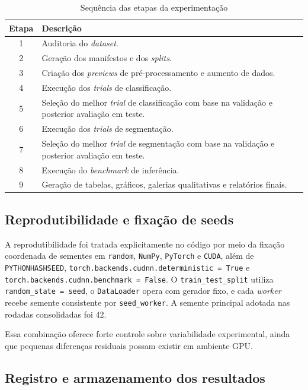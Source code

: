 \documentclass[tcc,capa]{texufpel}
\begin{document}
\begin{table}[htbp]
	\centering
	\caption{Sequência das etapas da experimentação}
	\label{tab:etapas_experimentacao}
	\begin{tabular}{|c|p{11.2cm}|}
		\hline
		\textbf{Etapa} & \textbf{Descrição} \\ \hline
		1 & Auditoria do \textit{dataset}. \\ \hline
		2 & Geração dos manifestos e dos \textit{splits}. \\ \hline
		3 & Criação dos \textit{previews} de pré-processamento e aumento de dados. \\ \hline
		4 & Execução dos \textit{trials} de classificação. \\ \hline
		5 & Seleção do melhor \textit{trial} de classificação com base na validação e posterior avaliação em teste. \\ \hline
		6 & Execução dos \textit{trials} de segmentação. \\ \hline
		7 & Seleção do melhor \textit{trial} de segmentação com base na validação e posterior avaliação em teste. \\ \hline
		8 & Execução do \textit{benchmark} de inferência. \\ \hline
		9 & Geração de tabelas, gráficos, galerias qualitativas e relatórios finais. \\ \hline
	\end{tabular}
\end{table}

\subsection{Reprodutibilidade e fixação de seeds}

A reprodutibilidade foi tratada explicitamente no código por meio da fixação coordenada de sementes em \texttt{random}, \texttt{NumPy}, \texttt{PyTorch} e \texttt{CUDA}, além de \texttt{PYTHONHASHSEED}, \texttt{torch.backends.cudnn.deterministic = True} e \texttt{torch.backends.cudnn.benchmark = False}. O \texttt{train\_test\_split} utiliza \texttt{random\_state = seed}, o \texttt{DataLoader} opera com gerador fixo, e cada \textit{worker} recebe semente consistente por \texttt{seed\_worker}. A semente principal adotada nas rodadas consolidadas foi 42.

Essa combinação oferece forte controle sobre variabilidade experimental, ainda que pequenas diferenças residuais possam existir em ambiente GPU.

\subsection{Registro e armazenamento dos resultados}
\end{document}
